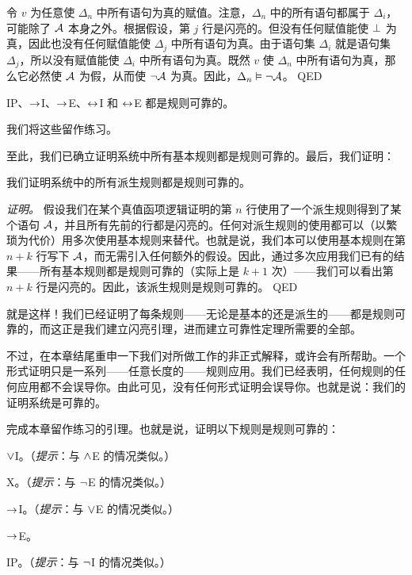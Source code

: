 \noindent
令 $v$ 为任意使 $\Delta_{n}$ 中所有语句为真的赋值。注意，$\Delta_{n}$ 中的所有语句都属于 $\Delta_i$，可能除了 $\mathcal{A}$ 本身之外。根据假设，第 $j$ 行是闪亮的。但没有任何赋值能使 $\bot$ 为真，因此也没有任何赋值能使 $\Delta_{j}$ 中所有语句为真。由于语句集 $\Delta_i$ 就是语句集 $\Delta_{j}$，所以没有赋值能使 $\Delta_i$ 中所有语句为真。既然 $v$ 使 $\Delta_{n}$ 中所有语句为真，那么它必然使 $\mathcal{A}$ 为假，从而使 $\neg \mathcal{A}$ 为真。因此，$\Delta_n \vDash \neg \mathcal{A}$。
\textsc{QED}

\begin{factoidboxe}\label{lem:LastRuleSound} IP、$\rightarrow$I、$\rightarrow$E、$\leftrightarrow$I 和 $\leftrightarrow$E 都是规则可靠的。
\end{factoidboxe}

我们将这些留作练习。

至此，我们已确立证明系统中所有基本规则都是规则可靠的。最后，我们证明：

\begin{factoidboxe}我们证明系统中的所有派生规则都是规则可靠的。
\end{factoidboxe}

\emph{证明。}
	假设我们在某个真值函项逻辑证明的第 $n$ 行使用了一个派生规则得到了某个语句 $\mathcal{A}$，并且所有先前的行都是闪亮的。任何对派生规则的使用都可以（以繁琐为代价）用多次使用基本规则来替代。也就是说，我们本可以使用基本规则在第 $n + k$ 行写下 $\mathcal{A}$，而无需引入任何额外的假设。因此，通过多次应用我们已有的结果——所有基本规则都是规则可靠的（实际上是 $k + 1$ 次）——我们可以看出第 $n+k$ 行是闪亮的。因此，该派生规则是规则可靠的。
\textsc{QED}

就是这样！我们已经证明了每条规则——无论是基本的还是派生的——都是规则可靠的，而这正是我们建立闪亮引理，进而建立可靠性定理所需要的全部。

不过，在本章结尾重申一下我们对所做工作的非正式解释，或许会有所帮助。一个形式证明只是一系列——任意长度的——规则应用。我们已经表明，任何规则的任何应用都不会误导你。由此可见，没有任何形式证明会误导你。也就是说：我们的证明系统是可靠的。

\practiceproblems

\problempart
\label{pr.Soundness}
完成本章留作练习的引理。也就是说，证明以下规则是规则可靠的：

\begin{compactlist}
		\item $\vee$I。（\emph{提示}：与 $\wedge$E 的情况类似。）
		\item X。（\emph{提示}：与 $\neg$E 的情况类似。）
		\item $\rightarrow$I。（\emph{提示}：与 $\vee$E 的情况类似。）
		\item $\rightarrow$E。
		\item IP。（\emph{提示}：与 $\neg$I 的情况类似。）
	\end{compactlist}
